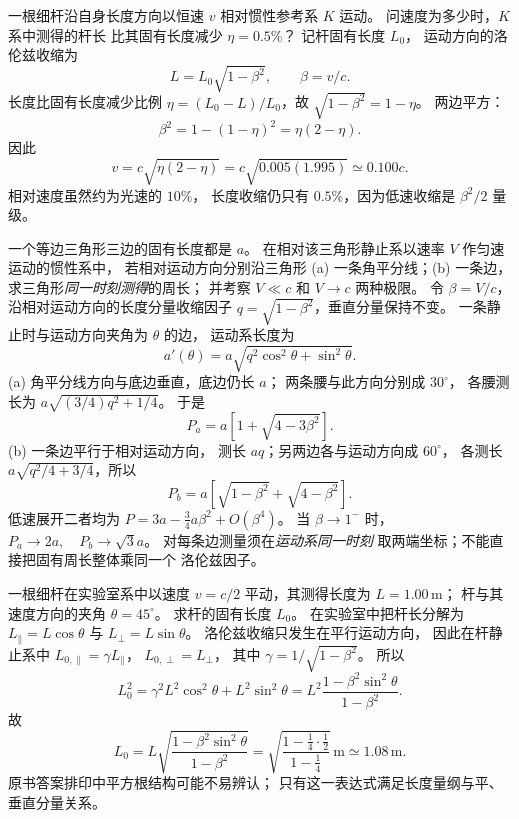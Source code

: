 一根细杆沿自身长度方向以恒速 $v$
相对惯性参考系 $K$ 运动。
问速度为多少时，$K$ 系中测得的杆长
比其固有长度减少 $\eta=0.5\%$？
\exsolution
记杆固有长度 $L_0$，
运动方向的洛伦兹收缩为
\[
L=L_0\sqrt{1-\beta^2},\qquad\beta=v/c.
\]
长度比固有长度减少比例
$\eta=(L_0-L)/L_0$，故
$\sqrt{1-\beta^2}=1-\eta$。
两边平方：
\[
\beta^2=1-(1-\eta)^2=\eta(2-\eta).
\]
因此
\[
\boxed{v=c\sqrt{\eta(2-\eta)}
=c\sqrt{0.005(1.995)}
\simeq0.100c}.
\]
\excheck 相对速度虽然约为光速的 $10\%$，
长度收缩仍只有 $0.5\%$，因为低速收缩是
$\beta^2/2$ 量级。

一个等边三角形三边的固有长度都是 $a$。
在相对该三角形静止系以速率 $V$
作匀速运动的惯性系中，
若相对运动方向分别沿三角形
(a) 一条角平分线；(b) 一条边，
求三角形\emph{同一时刻测得}的周长；
并考察 $V\ll c$ 和 $V\to c$ 两种极限。
\exsolution
令 $\beta=V/c$，
沿相对运动方向的长度分量收缩因子
$q=\sqrt{1-\beta^2}$，垂直分量保持不变。
一条静止时与运动方向夹角为 $\theta$ 的边，
运动系长度为
\[
a'(\theta)=a\sqrt{q^2\cos^2\theta+\sin^2\theta}.
\]
(a) 角平分线方向与底边垂直，底边仍长 $a$；
两条腰与此方向分别成 $30^\circ$，
各腰测长为
$a\sqrt{(3/4)q^2+1/4}$。
于是
\[
\boxed{P_a=a\left[1+\sqrt{4-3\beta^2}\right]}.
\]
(b) 一条边平行于相对运动方向，
测长 $aq$；另两边各与运动方向成 $60^\circ$，
各测长 $a\sqrt{q^2/4+3/4}$，所以
\[
\boxed{P_b=a\left[
\sqrt{1-\beta^2}+\sqrt{4-\beta^2}\right]}.
\]
低速展开二者均为
$P=3a-\tfrac34a\beta^2+O(\beta^4)$。
当 $\beta\to1^-$ 时，
$\boxed{P_a\to2a,\quad P_b\to\sqrt3a}$。
\excheck 对每条边测量须在\emph{运动系同一时刻}
取两端坐标；不能直接把固有周长整体乘同一个
洛伦兹因子。

一根细杆在实验室系中以速度
$v=c/2$ 平动，其测得长度为
$L=1.00\,\mathrm m$；
杆与其速度方向的夹角
$\theta=45^\circ$。
求杆的固有长度 $L_0$。
\exsolution
在实验室中把杆长分解为
$L_\parallel=L\cos\theta$ 与
$L_\perp=L\sin\theta$。
洛伦兹收缩只发生在平行运动方向，
因此在杆静止系中
$L_{0,\parallel}=\gamma L_\parallel$，
$L_{0,\perp}=L_\perp$，
其中 $\gamma=1/\sqrt{1-\beta^2}$。
所以
\[
L_0^2=\gamma^2L^2\cos^2\theta+L^2\sin^2\theta
=L^2\frac{1-\beta^2\sin^2\theta}{1-\beta^2}.
\]
故
\[
\boxed{L_0=L\sqrt{
\frac{1-\beta^2\sin^2\theta}{1-\beta^2}}
=\sqrt{\frac{1-\frac14\cdot\frac12}{1-\frac14}}
\,\mathrm m\simeq1.08\,\mathrm m}.
\]
\excheck 原书答案排印中平方根结构可能不易辨认；
只有这一表达式满足长度量纲与平、垂直分量关系。

